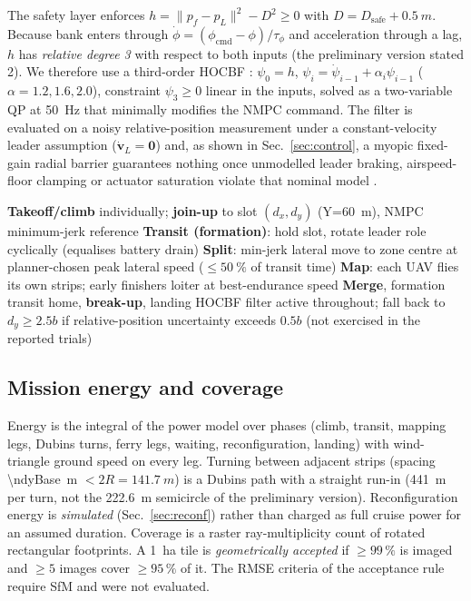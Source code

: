 \documentclass[preprint,12pt]{elsarticle}
\begin{document}
The safety layer enforces $h=\|p_f-p_L\|^2-D^2\ge0$ with $D=D_{\mathrm{safe}}+\SI{0.5}{m}$. Because bank enters through $\dot\phi=(\phi_{\mathrm{cmd}}-\phi)/\tau_\phi$ and acceleration through a lag, $h$ has \emph{relative degree 3} with respect to both inputs (the preliminary version stated 2). We therefore use a third-order HOCBF \cite{xiao2022,ames2017}: $\psi_0=h$, $\psi_{i}=\dot\psi_{i-1}+\alpha_i\psi_{i-1}$ ($\alpha=1.2,1.6,2.0$), constraint $\psi_3\ge0$ linear in the inputs, solved as a two-variable QP at \SI{50}{Hz} that minimally modifies the NMPC command. The filter is evaluated on a noisy relative-position measurement under a constant-velocity leader assumption ($\dot{\mathbf v}_L=\mathbf 0$) and, as shown in Sec.~\ref{sec:control}, a myopic fixed-gain radial barrier guarantees nothing once unmodelled leader braking, airspeed-floor clamping or actuator saturation violate that nominal model \cite{xiao2021ada,chen2021backup}.

\begin{algorithm}[H]
\caption{Supervisory logic per mission phase}\label{alg:sup}
\begin{algorithmic}[1]
\State \textbf{Takeoff/climb} individually; \textbf{join-up} to slot $(d_x,d_y)$ (Y=\SI{60}{m}), NMPC minimum-jerk reference
\State \textbf{Transit (formation)}: hold slot, rotate leader role cyclically (equalises battery drain)
\State \textbf{Split}: min-jerk lateral move to zone centre at planner-chosen peak lateral speed ($\le\SI{50}{\percent}$ of transit time)
\State \textbf{Map}: each UAV flies its own strips; early finishers loiter at best-endurance speed
\State \textbf{Merge}, formation transit home, \textbf{break-up}, landing
\State HOCBF filter active throughout; fall back to $d_y\ge 2.5b$ if relative-position uncertainty exceeds $0.5b$ (not exercised in the reported trials)
\end{algorithmic}\end{algorithm}

\subsection{Mission energy and coverage}
Energy is the integral of the power model over phases (climb, transit, mapping legs, Dubins turns, ferry legs, waiting, reconfiguration, landing) with wind-triangle ground speed on every leg. Turning between adjacent strips (spacing \SI{\ndyBase}{m} $<2R=\SI{141.7}{m}$) is a Dubins path with a straight run-in (\SI{441}{m} per turn, not the \SI{222.6}{m} semicircle of the preliminary version). Reconfiguration energy is \emph{simulated} (Sec.~\ref{sec:reconf}) rather than charged as full cruise power for an assumed duration. Coverage is a raster ray-multiplicity count of rotated rectangular footprints. A \SI{1}{ha} tile is \emph{geometrically accepted} if $\ge99\,\%$ is imaged and $\ge5$ images cover $\ge95\,\%$ of it. The RMSE criteria of the acceptance rule require SfM and were not evaluated.
\end{document}
